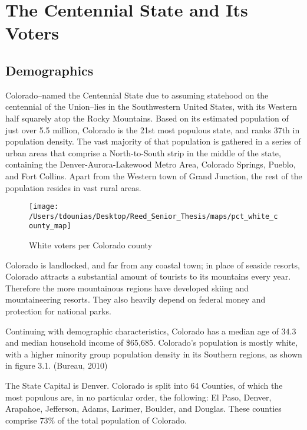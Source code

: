\documentclass[12pt,twoside]{reedthesis}
\begin{document}
  \section{The Centennial State and Its
  Voters}\label{the-centennial-state-and-its-voters}
  
  \subsection{Demographics}\label{demographics}
  
  Colorado--named the Centennial State due to assuming statehood on the
  centennial of the Union--lies in the Southwestern United States, with
  its Western half squarely atop the Rocky Mountains. Based on its
  estimated population of just over 5.5 million, Colorado is the 21st most
  populous state, and ranks 37th in population density. The vast majority
  of that population is gathered in a series of urban areas that comprise
  a North-to-South strip in the middle of the state, containing the
  Denver-Aurora-Lakewood Metro Area, Colorado Springs, Pueblo, and Fort
  Collins. Apart from the Western town of Grand Junction, the rest of the
  population resides in vast rural areas.
  
  \begin{figure}
  
  {\centering \texttt{[image: /Users/tdounias/Desktop/Reed\_Senior\_Thesis/maps/pct\_white\_county\_map]} 
  
  }
  
  \caption[White voters per Colorado county]{White voters per Colorado county}\label{fig:white pct map}
  \end{figure}
  
  Colorado is landlocked, and far from any coastal town; in place of
  seaside resorts, Colorado attracts a substantial amount of tourists to
  its mountains every year. Therefore the more mountainous regions have
  developed skiing and mountaineering resorts. They also heavily depend on
  federal money and protection for national parks.
  
  Continuing with demographic characteristics, Colorado has a median age
  of 34.3 and median household income of \$65,685. Colorado's population
  is mostly white, with a higher minority group population density in its
  Southern regions, as shown in figure 3.1. (Bureau, 2010)
  
  The State Capital is Denver. Colorado is split into 64 Counties, of
  which the most populous are, in no particular order, the following: El
  Paso, Denver, Arapahoe, Jefferson, Adams, Larimer, Boulder, and Douglas.
  These counties comprise 73\% of the total population of Colorado.
  
\end{document}
